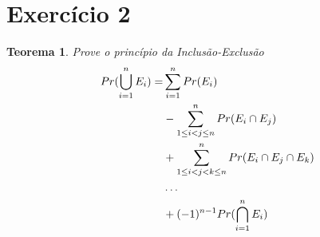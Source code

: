 \documentclass{article}
\begin{document}
\section{Exercício 2}
\newtheorem{teo2}{Teorema}
\begin{teo2}
    Prove o princípio da Inclusão-Exclusão
    \begin{equation}
    \notag
        \begin{split}
            Pr(\bigcup_{i = 1}^{n}E_i) =& \sum\limits_{i=1}^{n}Pr(E_i)\\
            & -\sum\limits_{1\leq i<j\leq n}^{n}Pr(E_i \cap E_j)\\
            & +\sum\limits_{1\leq i<j<k\leq n}^{n}Pr(E_i \cap E_j \cap E_k)\\
            & \ldots\\
            & +(-1)^{n-1}Pr(\bigcap_{i=1}^{n}E_i)
        \end{split}
    \end{equation}
\end{teo2}
\end{document}
